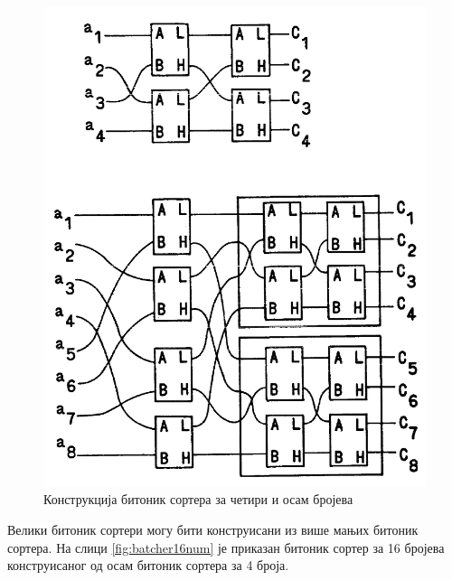 \documentclass[12pt, a4paper]{article}
\theoremstyle{definition}
\begin{document}
\begin{figure}[H]
  \centering
      \includegraphics[scale=0.3]{slike/batcher4_8num}
  \caption{Конструкција битоник сортера за четири и осам бројева}
  \label{fig:batcher4_8num}
\end{figure}

Велики битоник сортери могу бити конструисани из више мањих битоник сортера. На слици \ref{fig:batcher16num} је приказан битоник сортер за 16 бројева конструисаног од осам битоник сортера за 4 броја.
\end{document}
